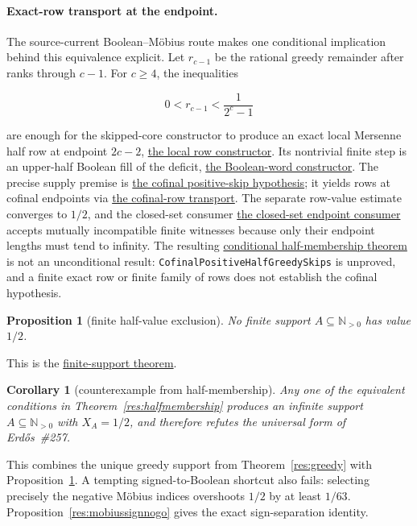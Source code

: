 \documentclass[11pt]{article}
\newcommand{\commit}{99f4bf47422abbd8757cbb22b50ba079d764d3a7}
\newcommand{\repobase}{https://github.com/wcook04/plectis-erdos/blob/\commit}
\newcommand{\PK}{Erdos249257}
\newcommand{\lword}[4]{\href{\repobase/\PK/#1\#L#2}{#4}}
\newtheorem{proposition}[theorem]{Proposition}
\newtheorem{corollary}[theorem]{Corollary}
\theoremstyle{definition}
\theoremstyle{remark}
\newcommand{\Npos}{\mathbb{N}_{>0}}
\begin{document}
\paragraph{Exact-row transport at the endpoint.}
The source-current Boolean--M\"obius route makes one conditional implication
behind this equivalence explicit.  Let $r_{c-1}$ be the rational greedy
remainder after ranks through $c-1$.  For $c\ge4$, the inequalities

\[
  0<r_{c-1}<\frac{1}{2^c-1}
\]

are enough for the skipped-core constructor to produce an exact local
Mersenne half row at endpoint $2c-2$,
\lword{BooleanMobiusSkipRowCofinal.lean}{55}{exactLocalMersenneHalfRow_of_positiveHalfGreedySkip}{the local row constructor}.
Its nontrivial finite step is an upper-half Boolean fill of the deficit,
\lword{BooleanMobiusSkippedCoreExactRow.lean}{228}{exists_upperHalfBooleanWord_of_skippedCore}{the Boolean-word constructor}.
The precise supply premise is
\lword{BooleanMobiusSkipRowCofinal.lean}{22}{CofinalPositiveHalfGreedySkips}{the cofinal positive-skip hypothesis};
it yields rows at cofinal endpoints via
\lword{BooleanMobiusSkipRowCofinal.lean}{84}{cofinalExactLocalMersenneHalfRows_of_positiveHalfGreedySkips}{the cofinal-row transport}.
The separate row-value estimate converges to $1/2$, and the closed-set
consumer
\lword{BooleanMobiusCofinalExactRows.lean}{71}{half_mem_mersenneAchievementSet_of_cofinalExactLocalRows}{the closed-set endpoint consumer}
accepts mutually incompatible finite witnesses because only their endpoint
lengths must tend to infinity.  The resulting
\lword{BooleanMobiusSkipRowCofinal.lean}{97}{half_mem_mersenneAchievementSet_of_positiveHalfGreedySkips}{conditional half-membership theorem}
is not an unconditional result: \texttt{CofinalPositiveHalfGreedySkips} is
unproved, and a finite exact row or finite family of rows does not establish
the cofinal hypothesis.

\begin{proposition}[finite half-value exclusion]\label{res:nofinitehalf}
No finite support \(A\subseteq\Npos\) has value \(1/2\).
\end{proposition}
\noindent This is the
\lword{HalfCarryReachability.lean}{589}{finite_boolSupport_ne_half}{finite-support theorem}.

\begin{corollary}[counterexample from half-membership]\label{res:halfcounterexample}
Any one of the equivalent conditions in
Theorem~\ref{res:halfmembership} produces an infinite support
\(A\subseteq\Npos\) with \(X_A=1/2\), and therefore refutes the
universal form of Erd\H{o}s~\#257.
\end{corollary}
\noindent This combines the unique greedy support from
Theorem~\ref{res:greedy} with Proposition~\ref{res:nofinitehalf}.
A tempting signed-to-Boolean shortcut also fails: selecting precisely the
negative M\"obius indices overshoots \(1/2\) by at least \(1/63\).
Proposition~\ref{res:mobiussignnogo} gives the exact sign-separation identity.
\end{document}
